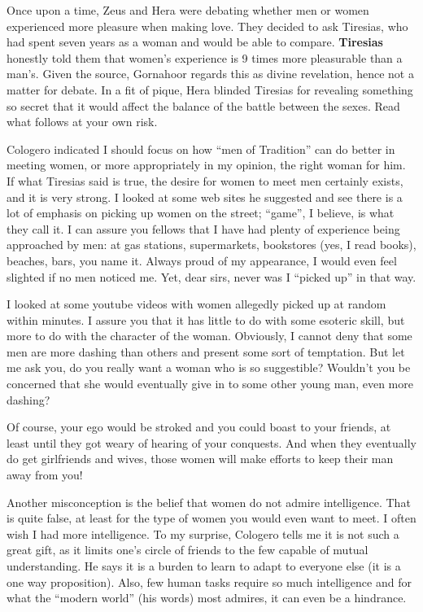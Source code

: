 \begin{quotex}
Once upon a time, Zeus and Hera were debating whether men or women experienced more pleasure when making love. They decided to ask Tiresias, who had spent seven years as a woman and would be able to compare. \textbf{Tiresias} honestly told them that women's experience is 9 times more pleasurable than a man's. Given the source, Gornahoor regards this as divine revelation, hence not a matter for debate. In a fit of pique, Hera blinded Tiresias for revealing something so secret that it would affect the balance of the battle between the sexes. Read what follows at your own risk.
\end{quotex}


Cologero indicated I should focus on how ``men of Tradition'' can do better in meeting women, or more appropriately in my opinion, the right woman for him. If what Tiresias said is true, the desire for women to meet men certainly exists, and it is very strong. I looked at some web sites he suggested and see there is a lot of emphasis on picking up women on the street; ``game'', I believe, is what they call it. I can assure you fellows that I have had plenty of experience being approached by men: at gas stations, supermarkets, bookstores (yes, I read books), beaches, bars, you name it. Always proud of my appearance, I would even feel slighted if no men noticed me. Yet, dear sirs, never was I ``picked up'' in that way.

I looked at some youtube videos with women allegedly picked up at random within minutes. I assure you that it has little to do with some esoteric skill, but more to do with the character of the woman. Obviously, I cannot deny that some men are more dashing than others and present some sort of temptation. But let me ask you, do you really want a woman who is so suggestible? Wouldn't you be concerned that she would eventually give in to some other young man, even more dashing?

Of course, your ego would be stroked and you could boast to your friends, at least until they got weary of hearing of your conquests. And when they eventually do get girlfriends and wives, those women will make efforts to keep their man away from you!

Another misconception is the belief that women do not admire intelligence. That is quite false, at least for the type of women you would even want to meet. I often wish I had more intelligence. To my surprise, Cologero tells me it is not such a great gift, as it limits one's circle of friends to the few capable of mutual understanding. He says it is a burden to learn to adapt to everyone else (it is a one way proposition). Also, few human tasks require so much intelligence and for what the ``modern world'' (his words) most admires, it can even be a hindrance.


